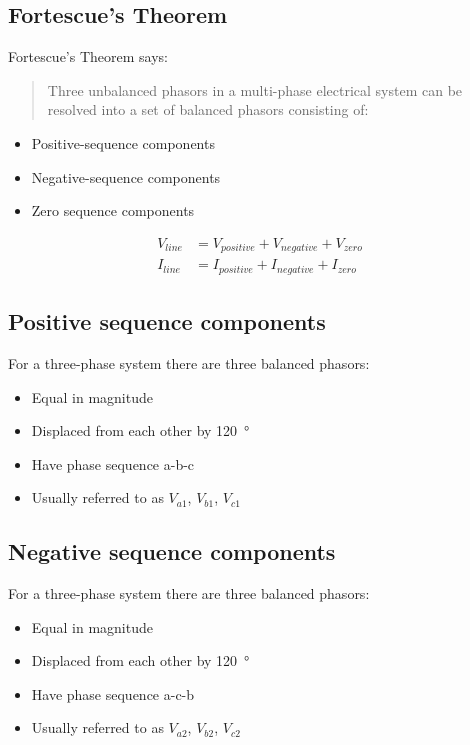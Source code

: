 \documentclass[class=report, crop=false, 12pt,a4paper]{standalone}
\begin{document}
\subsection{Fortescue's Theorem}
Fortescue's Theorem says:
\begin{quote}
	Three unbalanced phasors in a multi-phase electrical system can be resolved into a set of balanced phasors consisting of:
\end{quote}
\begin{itemize}
	\item Positive-sequence components
	\item Negative-sequence components
	\item Zero sequence components
\end{itemize}
\begin{align}
	V_{line} &= V_{positive} + V_{negative} + V_{zero}\\
	I_{line} &= I_{positive} + I_{negative} + I_{zero}
\end{align}
\subsection{Positive sequence components}
For a three-phase system there are three balanced phasors:
\begin{itemize}
	\item Equal in magnitude
	\item Displaced from each other by \SI{120}{\degree}
	\item Have phase sequence a-b-c
	\item Usually referred to as $V_{a1}$, $V_{b1}$, $V_{c1}$
\end{itemize}
\subsection{Negative sequence components}
For a three-phase system there are three balanced phasors:
\begin{itemize}
	\item Equal in magnitude
	\item Displaced from each other by \SI{120}{\degree}
	\item Have phase sequence a-c-b
	\item Usually referred to as $V_{a2}$, $V_{b2}$, $V_{c2}$
\end{itemize}
\end{document}

